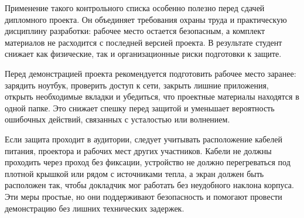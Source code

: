 Применение такого контрольного списка особенно полезно перед сдачей дипломного проекта. Он объединяет требования охраны труда и практическую дисциплину разработки: рабочее место остается безопасным, а комплект материалов не расходится с последней версией проекта. В результате студент снижает как физические, так и организационные риски подготовки к защите.


Перед демонстрацией проекта рекомендуется подготовить рабочее место заранее: зарядить ноутбук, проверить доступ к сети, закрыть лишние приложения, открыть необходимые вкладки и убедиться, что проектные материалы находятся в одной папке. Это снижает спешку перед защитой и уменьшает вероятность ошибочных действий, связанных с усталостью или волнением.


Если защита проходит в аудитории, следует учитывать расположение кабелей питания, проектора и рабочих мест других участников. Кабели не должны проходить через проход без фиксации, устройство не должно перегреваться под плотной крышкой или рядом с источниками тепла, а экран должен быть расположен так, чтобы докладчик мог работать без неудобного наклона корпуса. Эти меры простые, но они поддерживают безопасность и помогают провести демонстрацию без лишних технических задержек.
